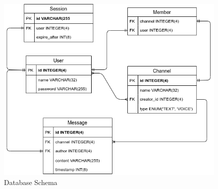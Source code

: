 \begin{figure}[h!]
    \caption{Database Schema}
    \label{image:databaseSchema}
    \centering
    \includegraphics[width=1\textwidth]{images/FullSchemaDesign.png}
\end{figure}